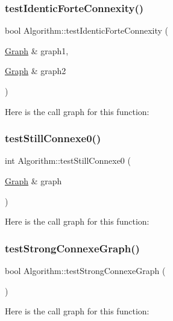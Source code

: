 \subsubsection{\texorpdfstring{test\+Identic\+Forte\+Connexity()}{testIdenticForteConnexity()}}
{\footnotesize\ttfamily bool Algorithm\+::test\+Identic\+Forte\+Connexity (\begin{DoxyParamCaption}\item[{\mbox{\hyperlink{class_graph}{Graph}} \&}]{graph1,  }\item[{\mbox{\hyperlink{class_graph}{Graph}} \&}]{graph2 }\end{DoxyParamCaption})}

Here is the call graph for this function\+:
\mbox{\label{struct_algorithm_afe508cd75cffaed44b891e17932b1ef8}} 
\subsubsection{\texorpdfstring{test\+Still\+Connexe0()}{testStillConnexe0()}}
{\footnotesize\ttfamily int Algorithm\+::test\+Still\+Connexe0 (\begin{DoxyParamCaption}\item[{\mbox{\hyperlink{class_graph}{Graph}} \&}]{graph }\end{DoxyParamCaption})}

Here is the call graph for this function\+:
\mbox{\label{struct_algorithm_a9a76807cae303dac7bcac84e18b00c86}} 
\subsubsection{\texorpdfstring{test\+Strong\+Connexe\+Graph()}{testStrongConnexeGraph()}}
{\footnotesize\ttfamily bool Algorithm\+::test\+Strong\+Connexe\+Graph (\begin{DoxyParamCaption}{ }\end{DoxyParamCaption})}

Here is the call graph for this function\+:
\mbox{\label{struct_algorithm_a2f0d23d667515747f55fc21c359c2fb1}} 
